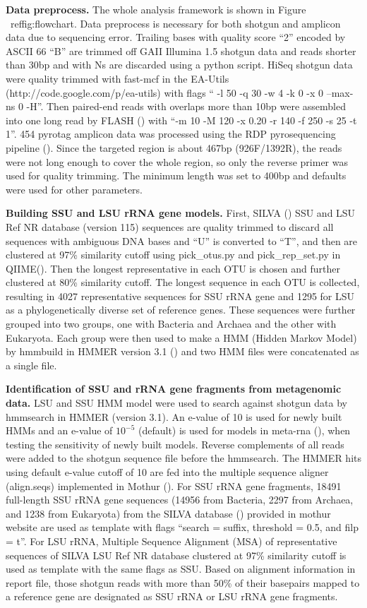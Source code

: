 \documentclass[12pt]{article}
\begin{document}
{\bf Data preprocess. } The whole analysis framework is shown in
Figure ~ref{fig:flowchart}. Data preprocess is necessary for both
shotgun and amplicon data due to sequencing error. Trailing bases with
quality score ``2'' encoded by ASCII 66 ``B'' are trimmed off GAII
Illumina 1.5 shotgun data and reads shorter than 30bp and with Ns are
discarded using a python script. HiSeq shotgun data were quality
trimmed with fast-mcf in the EA-Utils
(http://code.google.com/p/ea-utils) with flags `` -l 50 -q 30 -w 4 -k
0 -x 0 --max-ns 0 -H''. Then paired-end reads with overlaps more than
10bp were assembled into one long read by FLASH (\cite{flash2011})
with ``-m 10 -M 120 -x 0.20 -r 140 -f 250 -s 25 -t 1''. 454 pyrotag
amplicon data was processed using the RDP pyrosequencing pipeline
(\cite{rdp2009}). Since the targeted region is about 467bp
(926F/1392R), the reads were not long enough to cover the whole
region, so only the reverse primer was used for quality trimming. The
minimum length was set to 400bp and defaults were used for other
parameters.

{\bf Building SSU and LSU rRNA gene models. } First, SILVA
(\cite{silva2013}) SSU and LSU Ref NR database (version 115) sequences
are quality trimmed to discard all sequences with ambiguous DNA bases
and ``U'' is converted to ``T'', and then are clustered at 97\%
similarity cutoff using pick\_otus.py and pick\_rep\_set.py in
QIIME(\cite{qiime}). Then the longest representative in each OTU is
chosen and further clustered at 80\% similarity cutoff. The longest
sequence in each OTU is collected, resulting in 4027 representative
sequences for SSU rRNA gene and 1295 for LSU as a phylogenetically
diverse set of reference genes. These sequences were further grouped
into two groups, one with Bacteria and Archaea and the other with
Eukaryota. Each group were then used to make a HMM (Hidden Markov
Model) by hmmbuild in HMMER version 3.1 (\cite{hmmer3}) and two HMM
files were concatenated as a single file.

{\bf Identification of SSU and rRNA gene fragments from metagenomic
data. } LSU and SSU HMM model were used to search against shotgun data
by hmmsearch in HMMER (version 3.1). An e-value of 10 is used for
newly built HMMs and an e-value of $10^{-5}$ (default) is used for
models in meta-rna (\cite{metarna}), when testing the sensitivity of
newly built models. Reverse complements of all reads were added to the
shotgun sequence file before the hmmsearch. The HMMER hits using
default e-value cutoff of 10 are fed into the multiple sequence
aligner (align.seqs) implemented in Mothur
(\cite{mothuraligner2009}). For SSU rRNA gene fragments, 18491
full-length SSU rRNA gene sequences (14956 from Bacteria, 2297 from
Archaea, and 1238 from Eukaryota) from the SILVA database
(\cite{silva2013}) provided in mothur website are used as template
with flags ``search = suffix, threshold = 0.5, and filp = t''.  For
LSU rRNA, Multiple Sequence Alignment (MSA) of representative
sequences of SILVA LSU Ref NR database clustered at 97\% similarity
cutoff is used as template with the same flags as SSU. Based on
alignment information in report file, those shotgun reads with more
than 50\% of their basepairs mapped to a reference gene are designated
as SSU rRNA or LSU rRNA gene fragments.
\end{document}

